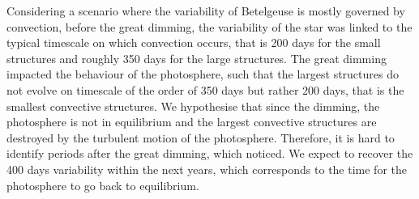 \documentclass{aa}
\begin{document}
Considering a scenario where the variability of Betelgeuse is mostly governed by convection, before the great dimming, the variability of the star was linked to the typical timescale on which convection occurs, that is 200 days for the small structures and roughly 350 days for the large structures. The great dimming impacted the behaviour of the photosphere, such that the largest structures do not evolve on timescale of the order of 350 days but rather 200 days, that is the smallest convective structures. We hypothesise that since the dimming, the photosphere is not in equilibrium and the largest convective structures are destroyed by the turbulent motion of the photosphere. Therefore, it is hard to identify periods after the great dimming, which \cite{dupree_great_2022} noticed. We expect to recover the 400 days variability within the next years, which corresponds to the time for the photosphere to go back to equilibrium.  


\end{document}
